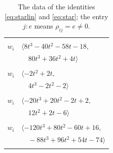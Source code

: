 \documentclass[11pt]{article}
\begin{document}
\begingroup\scriptsize
\setlength{\LTcapwidth}{\textwidth}
\begin{longtable}{@{}ll@{}}
\caption{The data of the identities \eqref{eq:starlin} and \eqref{eq:star}; the entry $j{:}e$ means $\rho_{ij}=e\neq0$.}\label{tab:star}\\
\hline\endfirsthead\hline\endhead\hline\endfoot
\multicolumn{2}{@{}p{0.97\textwidth}@{}}{$i=0$, $D_i=8$, $\rho_{ij}$: $5{:}2, \allowbreak 17{:}1, \allowbreak 20{:}1, \allowbreak 21{:}2, \allowbreak 25{:}2, \allowbreak 26{:}1, \allowbreak 28{:}1, \allowbreak 29{:}2, \allowbreak 30{:}2, \allowbreak 42{:}1, \allowbreak 46{:}2, \allowbreak 47{:}1, \allowbreak 50{:}2$}\\
$w_i$ & $\langle 8t^{3}-40t^{2}-58t-18,$\\
 & $\quad 80t^{3}+36t^{2}+4t\rangle$\\
\addlinespace[2pt]
\multicolumn{2}{@{}p{0.97\textwidth}@{}}{$i=1$, $D_i=2$, $\rho_{ij}$: $20{:}2, \allowbreak 24{:}2, \allowbreak 26{:}1, \allowbreak 34{:}1, \allowbreak 44{:}1$}\\
$w_i$ & $\langle -2t^{2}+2t,$\\
 & $\quad 4t^{3}-2t^{2}-2\rangle$\\
\addlinespace[2pt]
\multicolumn{2}{@{}p{0.97\textwidth}@{}}{$i=2$, $D_i=4$, $\rho_{ij}$: $16{:}2, \allowbreak 17{:}2, \allowbreak 19{:}2, \allowbreak 21{:}1, \allowbreak 22{:}1, \allowbreak 24{:}2, \allowbreak 35{:}2, \allowbreak 36{:}1, \allowbreak 37{:}1, \allowbreak 38{:}1, \allowbreak 52{:}2$}\\
$w_i$ & $\langle -20t^{3}+20t^{2}-2t+2,$\\
 & $\quad 12t^{2}+2t-6\rangle$\\
\addlinespace[2pt]
\multicolumn{2}{@{}p{0.97\textwidth}@{}}{$i=3$, $D_i=8$, $\rho_{ij}$: $10{:}2, \allowbreak 15{:}1, \allowbreak 19{:}1, \allowbreak 21{:}1, \allowbreak 24{:}1, \allowbreak 26{:}1, \allowbreak 29{:}1, \allowbreak 31{:}1, \allowbreak 32{:}2, \allowbreak 44{:}1, \allowbreak 50{:}1, \allowbreak 52{:}2, \allowbreak 53{:}2$}\\
$w_i$ & $\langle -120t^{3}+80t^{2}-60t+16,$\\
 & $\quad -88t^{3}+96t^{2}+54t-74\rangle$\\
\addlinespace[2pt]
\multicolumn{2}{@{}p{0.97\textwidth}@{}}{$i=4$, $D_i=256$, $\rho_{ij}$: $11{:}1, \allowbreak 12{:}1, \allowbreak 14{:}2, \allowbreak 16{:}1, \allowbreak 18{:}2, \allowbreak 24{:}2, \allowbreak 25{:}2, \allowbreak 26{:}2, \allowbreak 38{:}1, \allowbreak 39{:}1, \allowbreak 40{:}2, \allowbreak 41{:}1$}\\

\end{longtable}
\end{document}
